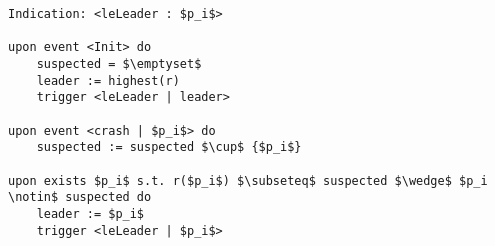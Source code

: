 \begin{lstlisting}[caption = Leader election with perfect failure detector, mathescape, captionpos=b]
Indication: <leLeader : $p_i$>

upon event <Init> do
    suspected = $\emptyset$
    leader := highest(r)
    trigger <leLeader | leader>

upon event <crash | $p_i$> do
    suspected := suspected $\cup$ {$p_i$}

upon exists $p_i$ s.t. r($p_i$) $\subseteq$ suspected $\wedge$ $p_i \notin$ suspected do
    leader := $p_i$
    trigger <leLeader | $p_i$>
\end{lstlisting}
